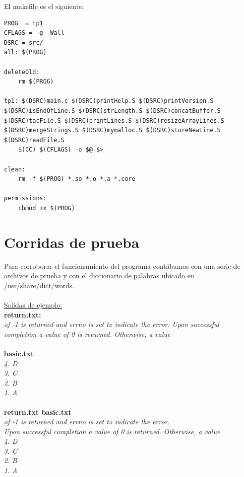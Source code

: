 \documentclass[a4paper,11pt]{article}
\begin{document}
El makefile es el siguiente:
\begin{lstlisting}
PROG  = tp1
CFLAGS = -g -Wall
DSRC = src/
all: $(PROG)

deleteOld:
	rm $(PROG)

tp1: $(DSRC)main.c $(DSRC)printHelp.S $(DSRC)printVersion.S $(DSRC)isEndOfLine.S $(DSRC)strLength.S $(DSRC)concatBuffer.S $(DSRC)tacFile.S $(DSRC)printLines.S $(DSRC)resizeArrayLines.S  $(DSRC)mergeStrings.S $(DSRC)mymalloc.S $(DSRC)storeNewLine.S $(DSRC)readFile.S
	$(CC) $(CFLAGS) -o $@ $>

clean:
	rm -f $(PROG) *.so *.o *.a *.core
	
permissions:
	chmod +x $(PROG)

\end{lstlisting}


\section{Corridas de prueba}
Para corroborar el funcionamiento del programa cont\'abamos con una serie de archivos de prueba y con el diccionario de palabras ubicado en /usr/share/dict/words. 
\\
\\
\underline{Salidas de ejemplo:}\\
\textbf{return.txt:}\\
\emph{of -1 is returned and errno is set to indicate the error.
Upon successful completion a value of 0 is returned. Otherwise, a value}
\\\\
\textbf{basic.txt}\\
\emph{4. D\\
3. C\\
2. B\\
1. A\\}\\
\textbf{return.txt basic.txt}\\
\emph{of -1 is returned and errno is set to indicate the error.\\
Upon successful completion a value of 0 is returned. Otherwise, a value\\
4. D\\
3. C\\
2. B\\
1. A}\\
\end{document}
